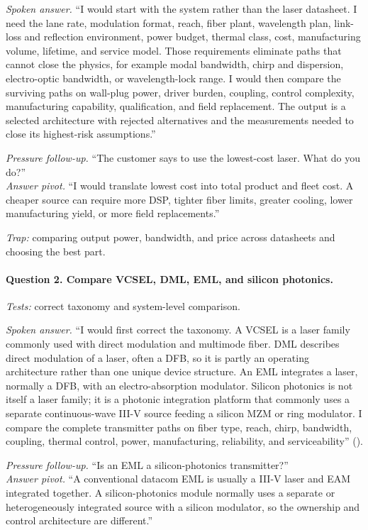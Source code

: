 \textit{Spoken answer.}
``I would start with the system rather than the laser datasheet. I need the
lane rate, modulation format, reach, fiber plant, wavelength plan, link-loss
and reflection environment, power budget, thermal class, cost, manufacturing
volume, lifetime, and service model. Those requirements eliminate paths that
cannot close the physics, for example modal bandwidth, chirp and dispersion,
electro-optic bandwidth, or wavelength-lock range. I would then compare the
surviving paths on wall-plug power, driver burden, coupling, control
complexity, manufacturing capability, qualification, and field replacement.
The output is a selected architecture with rejected alternatives and the
measurements needed to close its highest-risk assumptions.''

\textit{Pressure follow-up.} ``The customer says to use the lowest-cost laser.
What do you do?''\\
\textit{Answer pivot.} ``I would translate lowest cost into total product and
fleet cost. A cheaper source can require more DSP, tighter fiber limits,
greater cooling, lower manufacturing yield, or more field replacements.''

\textit{Trap:} comparing output power, bandwidth, and price across datasheets
and choosing the best part.

\paragraph{Question 2. Compare VCSEL, DML, EML, and silicon photonics.}
\textit{Tests:} correct taxonomy and system-level comparison.

\textit{Spoken answer.}
``I would first correct the taxonomy. A VCSEL is a laser family commonly used
with direct modulation and multimode fiber. DML describes direct modulation of
a laser, often a DFB, so it is partly an operating architecture rather than one
unique device structure. An EML integrates a laser, normally a DFB, with an
electro-absorption modulator. Silicon photonics is not itself a laser family;
it is a photonic integration platform that commonly uses a separate
continuous-wave III-V source feeding a silicon MZM or ring modulator. I compare
the complete transmitter paths on fiber type, reach, chirp, bandwidth,
coupling, thermal control, power, manufacturing, reliability, and
serviceability'' ().

\textit{Pressure follow-up.} ``Is an EML a silicon-photonics transmitter?''\\
\textit{Answer pivot.} ``A conventional datacom EML is usually a III-V laser
and EAM integrated together. A silicon-photonics module normally uses a
separate or heterogeneously integrated source with a silicon modulator, so the
ownership and control architecture are different.''

